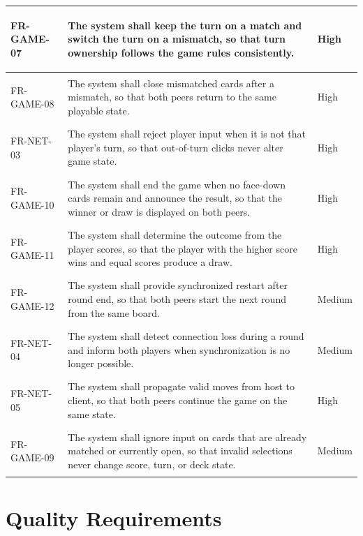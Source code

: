 \documentclass[a4paper,12pt]{article}
\begin{document}
\begin{longtable}{|p{2.1cm}|p{11.6cm}|p{1.3cm}|}
        \hline
        \hypertarget{req:FR-GAME-07}{FR-GAME-07} & The system shall keep the turn on a match and switch the turn on a mismatch, so that turn ownership follows the game rules consistently. & High \\
        \hline
        \hypertarget{req:FR-GAME-08}{FR-GAME-08} & The system shall close mismatched cards after a mismatch, so that both peers return to the same playable state. & High \\
        \hline
        \hypertarget{req:FR-NET-03}{FR-NET-03} & The system shall reject player input when it is not that player's turn, so that out-of-turn clicks never alter game state. & High \\
        \hline
        \hypertarget{req:FR-GAME-10}{FR-GAME-10} & The system shall end the game when no face-down cards remain and announce the result, so that the winner or draw is displayed on both peers. & High \\
        \hline
        \hypertarget{req:FR-GAME-11}{FR-GAME-11} & The system shall determine the outcome from the player scores, so that the player with the higher score wins and equal scores produce a draw. & High \\
        \hline
        \hypertarget{req:FR-GAME-12}{FR-GAME-12} & The system shall provide synchronized restart after round end, so that both peers start the next round from the same board. & Medium \\
        \hline
        \hypertarget{req:FR-NET-04}{FR-NET-04} & The system shall detect connection loss during a round and inform both players when synchronization is no longer possible. & Medium \\
        \hline
        \hypertarget{req:FR-NET-05}{FR-NET-05} & The system shall propagate valid moves from host to client, so that both peers continue the game on the same state. & High \\
        \hline
        \hypertarget{req:FR-GAME-09}{FR-GAME-09} & The system shall ignore input on cards that are already matched or currently open, so that invalid selections never change score, turn, or deck state. & Medium \\
        \hline
    \end{longtable}

    \section{Quality Requirements}
\end{document}
